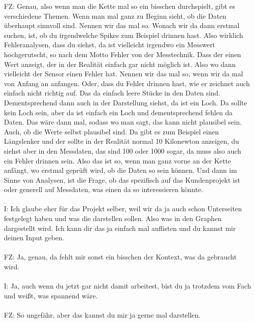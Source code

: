 \begin{linenumbers}
FZ: Genau, also wenn man die Kette mal so ein bisschen durchspielt, gibt es verschiedene Themen. Wenn man mal ganz zu Beginn sieht, ob die Daten überhaupt sinnvoll sind. Nennen wir das mal so.  Wonach wir da dann erstmal suchen, ist, ob du irgendwelche Spikes zum Beispiel drinnen hast. Also wirklich Fehleranalysen, dass du siehst, da ist vielleicht irgendwo ein Messwert hochgerutscht, so nach dem Motto Fehler von der Messtechnik. Dass der einen Wert anzeigt, der in der Realität einfach gar nicht möglich ist. Also wo dann vielleicht der Sensor einen Fehler hat. Nennen wir das mal so, wenn wir da mal von Anfang an anfangen. Oder, dass du Fehler drinnen hast, wie er zeichnet auch einfach nicht richtig auf. Das da einfach leere Stücke in den Daten sind. Dementsprechend dann auch in der Darstellung siehst, da ist ein Loch. Da sollte kein Loch sein, aber da ist einfach ein Loch und dementsprechend fehlen da Daten. Das wäre dann mal, sodass wo man sagt, das kann nicht plausibel sein. Auch, ob die Werte selbst plausibel sind. Da gibt es zum Beispiel einen Längslenker und der sollte in der Realität normal 10 Kilonewton anzeigen, du siehst aber in den Messdaten, das sind 100 oder 1000 sogar, da muss also auch ein Fehler drinnen sein. Also das ist so, wenn man ganz vorne an der Kette anfängt, wo erstmal geprüft wird, ob die Daten so sein können. Und dann im Sinne von Analysen, ist die Frage, ob das spezifisch auf das Kundenprojekt ist oder generell auf Messdaten, was einen da so interessieren könnte. \\\\   
I: Ich glaube eher für das Projekt selber, weil wir da ja auch schon Unterseiten festgelegt haben und was die darstellen sollen. Also was in den Graphen dargestellt wird. Ich kann dir das ja einfach mal auflisten und du kannst mir deinen Input geben.\\\\
FZ: Ja, genau, da fehlt mir sonst ein bisschen der Kontext, was da gebraucht wird.\\\\
I: Ja, auch wenn du jetzt gar nicht damit arbeitest, bist du ja trotzdem vom Fach und weißt, was spannend wäre.\\\\
FZ: So ungefähr, aber das kannst du mir ja gerne mal darstellen.\\\\

\end{linenumbers}
